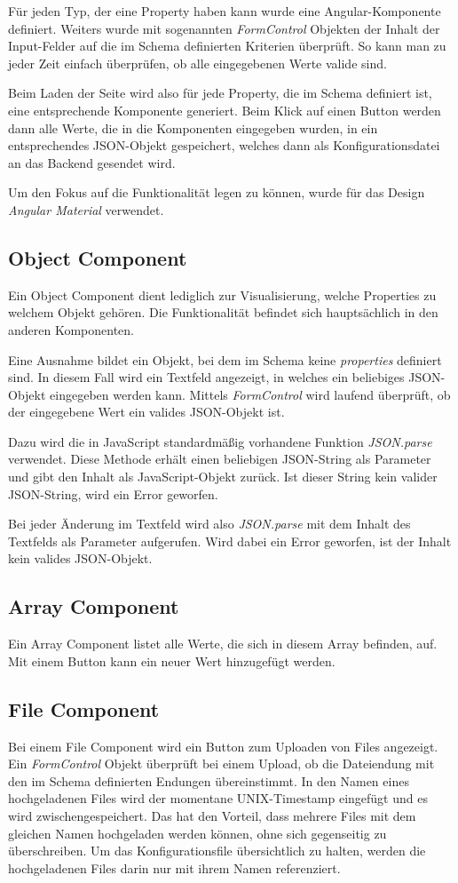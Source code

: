 Für jeden Typ, der eine Property haben kann wurde eine Angular-Komponente definiert.
Weiters wurde mit sogenannten \textit{FormControl} Objekten der Inhalt der Input-Felder auf die im Schema definierten
Kriterien überprüft.
So kann man zu jeder Zeit einfach überprüfen, ob alle eingegebenen Werte valide sind.

Beim Laden der Seite wird also für jede Property, die im Schema definiert ist, eine entsprechende Komponente generiert.
Beim Klick auf einen Button werden dann alle Werte, die in die Komponenten eingegeben wurden, in ein entsprechendes
JSON-Objekt gespeichert, welches dann als Konfigurationsdatei an das Backend gesendet wird.

Um den Fokus auf die Funktionalität legen zu können, wurde für das Design \textit{Angular Material} verwendet.

\subsection{Object Component}
Ein Object Component dient lediglich zur Visualisierung, welche Properties zu welchem Objekt gehören.
Die Funktionalität befindet sich hauptsächlich in den anderen Komponenten.

Eine Ausnahme bildet ein Objekt, bei dem im Schema keine \textit{properties} definiert sind.
In diesem Fall wird ein Textfeld angezeigt, in welches ein beliebiges JSON-Objekt eingegeben werden kann.
Mittels \textit{FormControl} wird laufend überprüft, ob der eingegebene Wert ein valides JSON-Objekt ist.

Dazu wird die in JavaScript standardmäßig vorhandene Funktion \textit{JSON.parse} verwendet.
Diese Methode erhält einen beliebigen JSON-String als Parameter und gibt den Inhalt als JavaScript-Objekt zurück.
Ist dieser String kein valider JSON-String, wird ein Error geworfen.

Bei jeder Änderung im Textfeld wird also \textit{JSON.parse} mit dem Inhalt des Textfelds als Parameter aufgerufen.
Wird dabei ein Error geworfen, ist der Inhalt kein valides JSON-Objekt.

\subsection{Array Component}
Ein Array Component listet alle Werte, die sich in diesem Array befinden, auf.
Mit einem Button kann ein neuer Wert hinzugefügt werden.

\subsection{File Component}
Bei einem File Component wird ein Button zum Uploaden von Files angezeigt.
Ein \textit{FormControl} Objekt überprüft bei einem Upload, ob die Dateiendung mit den im Schema definierten
Endungen übereinstimmt.
In den Namen eines hochgeladenen Files wird der momentane UNIX-Timestamp eingefügt und es wird zwischengespeichert.
Das hat den Vorteil, dass mehrere Files mit dem gleichen Namen hochgeladen werden können, ohne sich gegenseitig zu
überschreiben.
Um das Konfigurationsfile übersichtlich zu halten, werden die hochgeladenen Files darin nur mit ihrem Namen referenziert.

